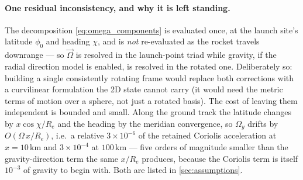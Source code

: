 {\paragraph{One residual inconsistency, and why it is left standing.} The decomposition
\autoref{eq:omega_components} is evaluated once, at the launch site's latitude $\phi_0$ and
heading $\chi$, and is \emph{not} re-evaluated as the rocket travels downrange --- so
$\vec{\Omega}$ is resolved in the launch-point triad while gravity, if the radial direction
model is enabled, is resolved in the rotated one. Deliberately so: building a single consistently
rotating frame would replace both corrections with a curvilinear formulation the 2D state cannot
carry (it would need the metric terms of motion over a sphere, not just a rotated basis). The
cost of leaving them independent is bounded and small. Along the ground track the latitude
changes by $x\cos\chi/R_e$ and the heading by the meridian convergence, so $\Omega_y$ drifts by
$O(\Omega\,x/R_e)$, i.e.\ a relative $3\times10^{-6}$ of the retained Coriolis acceleration at
$x = 10\,\mathrm{km}$ and $3\times10^{-4}$ at $100\,\mathrm{km}$ --- five orders of magnitude
smaller than the gravity-direction term the same $x/R_e$ produces, because the Coriolis term is
itself $10^{-3}$ of gravity to begin with. Both are listed in \autoref{sec:assumptions}.}
